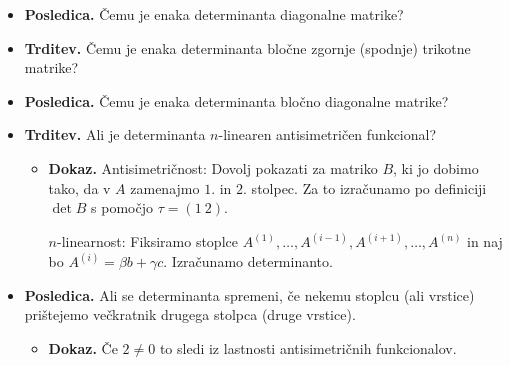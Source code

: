 \begin{enumerate}
\begin{itemize}
        \item \colorbox{orange!30}{\textbf{Posledica.}} Čemu je enaka determinanta diagonalne matrike?
        \item \colorbox{blue!30}{\textbf{Trditev.}} Čemu je enaka determinanta bločne zgornje (spodnje) trikotne matrike?
        \item \colorbox{orange!30}{\textbf{Posledica.}} Čemu je enaka determinanta bločno diagonalne matrike?
        \item \colorbox{blue!30}{\textbf{Trditev.}} Ali je determinanta $n$-linearen antisimetričen funkcional?
        \begin{itemize}
            \item \colorbox{green!30}{\textbf{Dokaz.}} Antisimetričnost: Dovolj pokazati za matriko $B$, ki jo dobimo tako, da v $A$ zamenajmo $1.$ in $2.$ stolpec. Za to izračunamo po definiciji $\det B$ s pomočjo $\tau = (1\ 2)$.
            
            $n$-linearnost: Fiksiramo stoplce $A^{(1)}, \ldots, A^{(i-1)}, A^{(i+1)}, \ldots, A^{(n)}$ in naj bo $A^{(i)} = \beta b + \gamma c$. Izračunamo determinanto.
        \end{itemize}

        \newpage
        \item \colorbox{orange!30}{\textbf{Posledica.}} Ali se determinanta spremeni, če nekemu stoplcu (ali vrstice) prištejemo večkratnik drugega stolpca (druge vrstice).
        \begin{itemize}
            \item \colorbox{green!30}{\textbf{Dokaz.}} Če $2 \neq 0$ to sledi iz lastnosti antisimetričnih funkcionalov.
            

\end{itemize}
\end{itemize}
\end{enumerate}
